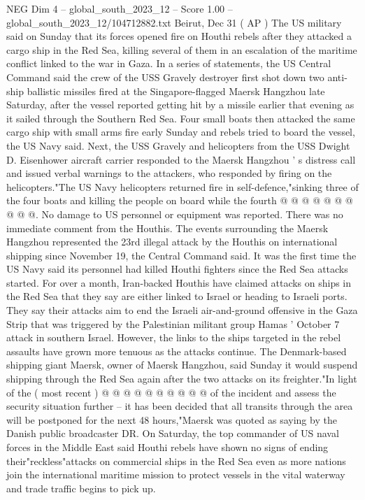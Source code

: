 \begin{textsample}{NEG Dim 4 – global\_south\_2023\_12 – Score 1.00 – global\_south\_2023\_12/104712882.txt}  \label{ex:f4_neg_323}
Beirut, Dec 31 ( AP ) The US military said on Sunday that its forces opened fire on Houthi rebels after they attacked a cargo ship in the Red Sea, killing several of them in an escalation of the maritime conflict linked to the war in Gaza.
In a series of statements, the US Central Command said the crew of the USS Gravely destroyer first shot down two anti-ship ballistic missiles fired at the Singapore-flagged Maersk Hangzhou late Saturday, after the vessel reported getting hit by a missile earlier that evening as it sailed through the Southern Red Sea.
Four small boats then attacked the same cargo ship with small arms fire early Sunday and rebels tried to board the vessel, the US Navy said.
Next, the USS Gravely and helicopters from the USS Dwight D.
Eisenhower aircraft carrier responded to the Maersk Hangzhou ' s distress call and issued verbal warnings to the attackers, who responded by firing on the helicopters."The US Navy helicopters returned fire in self-defence,"sinking three of the four boats and killing the people on board while the fourth @ @ @ @ @ @ @ @ @ @.
No damage to US personnel or equipment was reported.
There was no immediate comment from the Houthis.
The events surrounding the Maersk Hangzhou represented the 23rd illegal attack by the Houthis on international shipping since November 19, the Central Command said.
It was the first time the US Navy said its personnel had killed Houthi fighters since the Red Sea attacks started.
For over a month, Iran-backed Houthis have claimed attacks on ships in the Red Sea that they say are either linked to Israel or heading to Israeli ports.
They say their attacks aim to end the Israeli air-and-ground offensive in the Gaza Strip that was triggered by the Palestinian militant group Hamas ' October 7 attack in southern Israel.
However, the links to the ships targeted in the rebel assaults have grown more tenuous as the attacks continue.
The Denmark-based shipping giant Maersk, owner of Maersk Hangzhou, said Sunday it would suspend shipping through the Red Sea again after the two attacks on its freighter."In light of the ( most recent ) @ @ @ @ @ @ @ @ @ @ of the incident and assess the security situation further -- it has been decided that all transits through the area will be postponed for the next 48 hours,"Maersk was quoted as saying by the Danish public broadcaster DR.
On Saturday, the top commander of US naval forces in the Middle East said Houthi rebels have shown no signs of ending their"reckless"attacks on commercial ships in the Red Sea even as more nations join the international maritime mission to protect vessels in the vital waterway and trade traffic begins to pick up.

\end{textsample}

